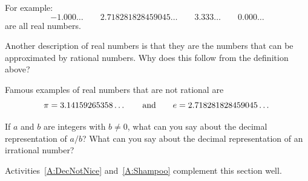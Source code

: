 For example:
\[
-1.000\dots \qquad 2.718281828459045\dots \qquad 3.333\dots \qquad 0.000\dots
\]
are all real numbers.

\begin{question} 
Another description of real numbers is that they are the numbers that
can be approximated by rational numbers. Why does this follow from the
definition above?
\end{question}
\QM

Famous examples of real numbers that are not rational are
\[\index{e@$e$}\index{pi@$\pi$}
\pi = 3.14159265358\dots\qquad \text{and}\qquad e = 2.718281828459045\dots
\]

\begin{question}
If $a$ and $b$ are integers with $b \ne 0$, what can you say about the
decimal representation of $a/b$? What can you say about the decimal
representation of an irrational number?
\end{question}
\QM




\begin{teachingnote}
Activities~\ref{A:DecNotNice} and~\ref{A:Shampoo} complement this section well. 
\end{teachingnote}




\newpage


